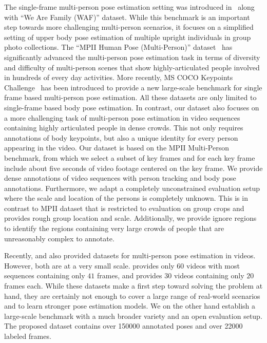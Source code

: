 \documentclass[10pt,twocolumn,letterpaper]{article}
\begin{document}
The single-frame multi-person pose estimation setting was introduced
in~\cite{eichner10eccv} along with ``We Are Family (WAF)'' dataset.
While this benchmark is an important step towards more challenging
multi-person scenarios, it focuses on a simplified setting of upper
body pose estimation of multiple upright individuals in group photo
collections. The ``MPII Human Pose (Multi-Person)''
dataset~\cite{andriluka14cvpr} has significantly advanced the multi-person
pose estimation task in terms of diversity and difficulty of
multi-person scenes that show highly-articulated people involved in
hundreds of every day activities. More recently, MS COCO Keypoints
Challenge~\cite{lin14eccv} has been introduced to provide a new large-scale benchmark for single frame based
multi-person pose estimation. 
All these datasets are only limited to single-frame based body pose estimation.
In contrast, our dataset also focuses on a more challenging task of multi-person
pose estimation in video sequences containing highly articulated people in dense
crowds. This not only requires annotations of body keypoints, but also a unique
identity for every person appearing in the video.  Our dataset is based on the MPII
Multi-Person benchmark, from which we select a subset of key frames and for each
key frame include about five seconds of video footage centered on the key
frame. We provide dense annotations of video sequences with person tracking and
body pose annotations. Furthermore, we adapt a completely unconstrained
evaluation setup where the scale and location of the persons is completely
unknown. This is in contrast to MPII dataset that is restricted to evaluation on
group crops and provides rough group location and scale. Additionally, we
provide ignore regions to identify the regions containing very large crowds of
people that are unreasonably complex to annotate.

Recently, \cite{Iqbal:2017:CVPR} and \cite{insafutdinov17cvpr} also 
provided datasets for multi-person pose estimation in videos. However, both are 
at a very small scale. \cite{Iqbal:2017:CVPR} provides only 60 videos with most 
sequences containing only $41$ frames, and \cite{insafutdinov17cvpr} 
provides $30$ videos containing only $20$ frames each. While these datasets 
make a first step toward solving the problem at hand, they are certainly 
not enough to cover a large range of real-world scenarios and to learn stronger 
pose estimation models. We on the other hand establish a large-scale benchmark
with a much broader variety and an open evaluation setup. 
The proposed dataset contains over \num{150000} annotated poses and over \num{22000} 
labeled frames.
\end{document}
